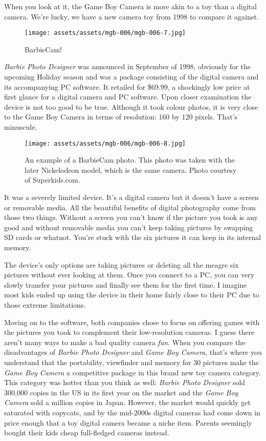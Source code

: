 \documentclass{book}
\begin{document}
When you look at it, the Game Boy Camera is more akin to a toy than a digital camera. We’re lucky, we have a new camera toy from 1998 to compare it against.

\begin{figure}[hbt]
\vskip 10pt
\centering \texttt{[image: assets/assets/mgb-006/mgb-006-7.jpg]}\par\pagetwodescription BarbieCam!
\vskip 6pt
\end{figure}

\emph{Barbie Photo Designer} was announced in September of 1998, obviously for the upcoming Holiday season and was a package consisting of the digital camera and its accompanying PC software. It retailed for \$69.99, a shockingly low price at first glance for a digital camera and PC software. Upon closer examination the device is not too good to be true. Although it took colour photos, it is very close to the Game Boy Camera in terms of resolution: 160 by 120 pixels. That’s minuscule.

\begin{figure}[hbt]
\vskip 10pt
\centering \texttt{[image: assets/assets/mgb-006/mgb-006-8.jpg]}\par\pagetwodescription An example of a BarbieCam photo. This photo was taken with the later Nickelodeon model, which is the same camera. Photo courtesy of Superkids.com.
\vskip 6pt
\end{figure}

It was a severely limited device. It’s a digital camera but it doesn’t have a screen or removable media. All the beautiful benefits of digital photography come from those two things. Without a screen you can’t know if the picture you took is any good and without removable media you can’t keep taking pictures by swapping SD cards or whatnot. You’re stuck with the six pictures it can keep in its internal memory.

The device’s only options are taking pictures or deleting all the meagre six pictures without ever looking at them. Once you connect to a PC, you can very slowly transfer your pictures and finally see them for the first time. I imagine most kids ended up using the device in their home fairly close to their PC due to those extreme limitations.

Moving on to the software, both companies chose to focus on offering games with the pictures you took to complement their low-resolution cameras. I guess there aren’t many ways to make a bad quality camera \emph{fun}. When you compare the disadvantages of \emph{Barbie Photo Designer} and \emph{Game Boy Camera}, that’s where you understand that the portability, viewfinder and memory for 30 pictures make the \emph{Game Boy Camera} a competitive package in this brand new toy camera category. This category was hotter than you think as well: \emph{Barbie Photo Designer} sold 300,000 copies in the US in its first year on the market and the \emph{Game Boy Camera} sold a million copies in Japan. However, the market would quickly get saturated with copycats, and by the mid-2000s digital cameras had come down in price enough that a toy digital camera became a niche item. Parents seemingly bought their kids cheap full-fledged cameras instead.
\end{document}
